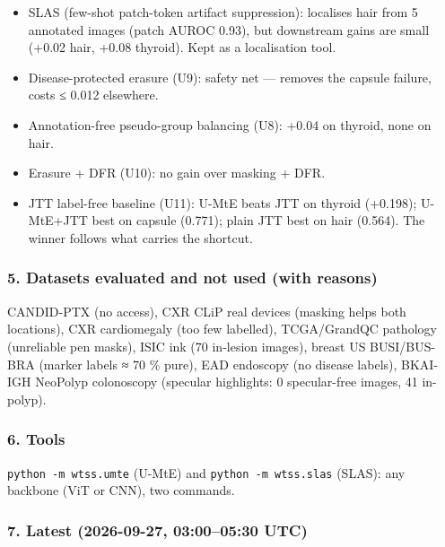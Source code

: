{\begin{itemize}
\item
  SLAS (few-shot patch-token artifact suppression): localises hair from 5 annotated images (patch AUROC 0.93),
  but downstream gains are small (+0.02 hair, +0.08 thyroid). Kept as a localisation tool.
\item
  Disease-protected erasure (U9): safety net --- removes the capsule failure, costs ≤ 0.012 elsewhere.
\item
  Annotation-free pseudo-group balancing (U8): +0.04 on thyroid, none on hair.
\item
  Erasure + DFR (U10): no gain over masking + DFR.
\item
  JTT label-free baseline (U11): U-MtE beats JTT on thyroid (+0.198); U-MtE+JTT best on capsule (0.771);
  plain JTT best on hair (0.564). The winner follows what carries the shortcut.
\end{itemize}

\subsubsection{5. Datasets evaluated and not used (with reasons)}\label{5-datasets-evaluated-and-not-used-with-reasons}

CANDID-PTX (no access), CXR CLiP real devices (masking helps both locations), CXR cardiomegaly (too few labelled),
TCGA/GrandQC pathology (unreliable pen masks), ISIC ink (70 in-lesion images), breast US BUSI/BUS-BRA (marker
labels ≈ 70 \% pure), EAD endoscopy (no disease labels), BKAI-IGH NeoPolyp colonoscopy (specular highlights: 0 specular-free images, 41 in-polyp).

\subsubsection{6. Tools}\label{6-tools}

\texttt{python\ -m\ wtss.umte} (U-MtE) and \texttt{python\ -m\ wtss.slas} (SLAS): any backbone (ViT or CNN), two commands.

\subsubsection{7. Latest (2026-09-27, 03:00--05:30 UTC)}\label{7-latest-2026-09-27-03000530-utc}

\begin{itemize}


\end{itemize}}
